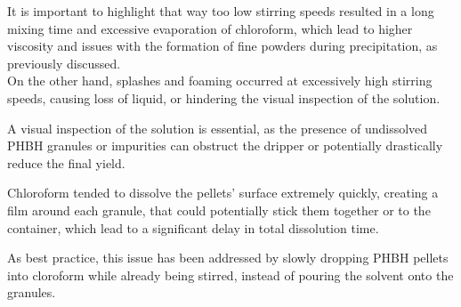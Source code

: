 \documentclass{article}
\begin{document}
        It is important to highlight that way too low stirring speeds resulted in a long mixing time and excessive evaporation of chloroform, which lead to 
        higher viscosity and issues with the formation of fine powders during precipitation, as previously discussed. \\ 

        On the other hand, splashes and foaming occurred at excessively high stirring speeds, causing loss of liquid, or
        hindering the visual inspection of the solution. 

        A visual inspection of the solution is essential, as the presence of undissolved PHBH granules or impurities can 
        obstruct the dripper or potentially drastically reduce the final yield. 

        Chloroform tended to dissolve the pellets' surface extremely quickly, creating a film around each granule, that could potentially stick 
        them together or to the container, which lead to a significant delay in total dissolution time. 

        As best practice, this issue has been addressed by slowly dropping PHBH pellets into cloroform while already being stirred, instead of pouring 
        the solvent onto the granules. \\ 

%
%
%
%
%
%
%
\end{document}
